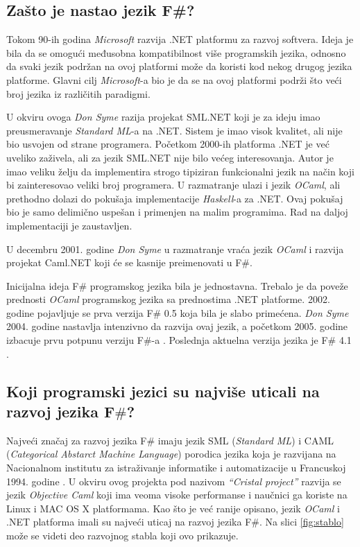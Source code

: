 \documentclass[a4paper]{article}
\begin{document}
\subsection{Zašto je nastao jezik F\#?}
\label{subsec:nastanak}

Tokom 90-ih godina {\em Microsoft} razvija .NET \cite{microsoft_.net,early_history} platformu za razvoj softvera. Ideja je bila da se omogući međusobna kompatibilnost više programskih jezika, odnosno da svaki jezik podržan na ovoj platformi može da koristi kod nekog drugog jezika platforme. Glavni cilj {\em Microsoft}-a bio je da se na ovoj platformi podrži što veći broj jezika iz različitih paradigmi. 

U okviru ovoga {\em Don Syme} razija projekat SML.NET koji je za ideju imao preusmeravanje {\em Standard ML}-a na .NET. Sistem je imao visok kvalitet, ali nije bio usvojen od strane programera. Početkom 2000-ih platforma .NET je već uveliko zaživela, ali za jezik SML.NET nije bilo većeg interesovanja. Autor je imao veliku želju da implementira strogo tipiziran funkcionalni jezik na način koji bi zainteresovao veliki broj programera. U razmatranje ulazi i jezik {\em OCaml}, ali prethodno dolazi do pokušaja implementacije {\em Haskell}-a za .NET. Ovaj pokušaj bio je samo delimično uspešan i primenjen na malim programima. Rad na daljoj implementaciji je zaustavljen.

U decembru 2001. godine {\em Don Syme} u razmatranje vraća jezik {\em OCaml} i razvija projekat Caml.NET koji će se kasnije preimenovati u F\#.

Inicijalna ideja F\# programskog jezika bila je jednostavna. Trebalo je da poveže prednosti {\em OCaml} programskog jezika sa prednostima .NET platforme. 2002. godine pojavljuje se prva verzija F\# 0.5 koja bila je slabo primećena. {\em Don Syme} 2004. godine nastavlja intenzivno da razvija ovaj jezik, a početkom 2005. godine izbacuje prvu potpunu verziju F\#-a \cite{early_history}.
Poslednja aktuelna verzija jezika je F\# 4.1 \cite{fsharp}.

\subsection{Koji programski jezici su najviše uticali na razvoj jezika F$\#$?}
\label{subsec:uticaj}

Najveći značaj za razvoj jezika F\# imaju jezik SML ({\em Standard ML}) i CAML ({\em Categorical Abstarct Machine Language}) porodica jezika koja je razvijana na Nacionalnom institutu za istraživanje informatike i automatizacije u Francuskoj 1994. godine \cite{Harrop:2008:FS:1481410}. U okviru ovog projekta pod nazivom {\em “Cristal project”} razvija se jezik {\em Objective Caml} koji ima veoma visoke performanse i naučnici ga koriste na Linux i MAC OS X platformama. Kao što je već ranije opisano, jezik {\em OCaml} i .NET platforma imali su najveći uticaj na razvoj jezika F\#. Na slici \ref{fig:stablo} može se videti deo razvojnog stabla koji ovo prikazuje.
\end{document}
